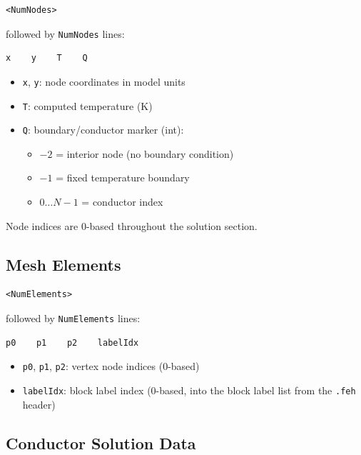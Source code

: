 \documentclass[11pt]{article}
\begin{document}
\begin{lstlisting}
<NumNodes>
\end{lstlisting}

followed by \texttt{NumNodes} lines:

\begin{lstlisting}
x    y    T    Q
\end{lstlisting}

\begin{itemize}[nosep]
  \item \texttt{x}, \texttt{y}: node coordinates in model units
  \item \texttt{T}: computed temperature (K)
  \item \texttt{Q}: boundary/conductor marker (int):
    \begin{itemize}[nosep]
      \item $-2$ = interior node (no boundary condition)
      \item $-1$ = fixed temperature boundary
      \item $0 \ldots N-1$ = conductor index
    \end{itemize}
\end{itemize}

Node indices are 0-based throughout the solution section.

\subsection{Mesh Elements}

\begin{lstlisting}
<NumElements>
\end{lstlisting}

followed by \texttt{NumElements} lines:

\begin{lstlisting}
p0    p1    p2    labelIdx
\end{lstlisting}

\begin{itemize}[nosep]
  \item \texttt{p0}, \texttt{p1}, \texttt{p2}: vertex node indices (0-based)
  \item \texttt{labelIdx}: block label index (0-based, into the block
        label list from the \texttt{.feh} header)
\end{itemize}

\subsection{Conductor Solution Data}
\end{document}

